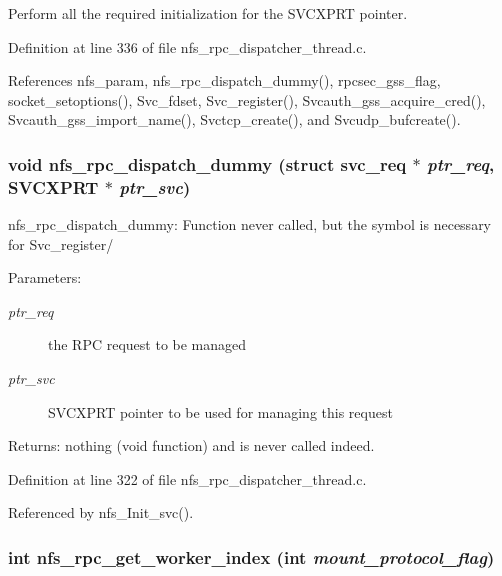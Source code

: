 Perform all the required initialization for the SVCXPRT pointer. 

Definition at line 336 of file nfs\_\-rpc\_\-dispatcher\_\-thread.c.

References nfs\_\-param, nfs\_\-rpc\_\-dispatch\_\-dummy(), rpcsec\_\-gss\_\-flag, socket\_\-setoptions(), Svc\_\-fdset, Svc\_\-register(), Svcauth\_\-gss\_\-acquire\_\-cred(), Svcauth\_\-gss\_\-import\_\-name(), Svctcp\_\-create(), and Svcudp\_\-bufcreate().
\subsubsection{\setlength{\rightskip}{0pt plus 5cm}void nfs\_\-rpc\_\-dispatch\_\-dummy (struct svc\_\-req $\ast$ {\em ptr\_\-req}, SVCXPRT $\ast$ {\em ptr\_\-svc})}\label{nfs__rpc__dispatcher__thread_8c_a19}


nfs\_\-rpc\_\-dispatch\_\-dummy: Function never called, but the symbol is necessary for Svc\_\-register/

\begin{Desc}
\item[Parameters:]
\begin{description}
\item[{\em ptr\_\-req}]the RPC request to be managed \item[{\em ptr\_\-svc}]SVCXPRT pointer to be used for managing this request\end{description}
\end{Desc}
\begin{Desc}
\item[Returns:]nothing (void function) and is never called indeed. \end{Desc}


Definition at line 322 of file nfs\_\-rpc\_\-dispatcher\_\-thread.c.

Referenced by nfs\_\-Init\_\-svc().
\subsubsection{\setlength{\rightskip}{0pt plus 5cm}int nfs\_\-rpc\_\-get\_\-worker\_\-index (int {\em mount\_\-protocol\_\-flag})}\label{nfs__rpc__dispatcher__thread_8c_a22}


